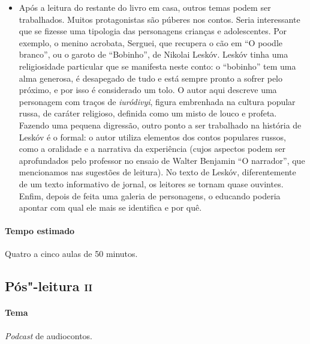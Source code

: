 \documentclass[11pt]{extarticle}
\begin{document}
\begin{itemize}
\item Após a leitura do restante do livro em casa, outros temas podem ser
trabalhados. Muitos protagonistas são púberes nos contos. Seria
interessante que se fizesse uma tipologia das personagens crianças e
adolescentes. Por exemplo, o menino acrobata, Serguei, que recupera o
cão em ``O poodle branco'', ou o garoto de ``Bobinho'', de Nikolai
Leskóv. Leskóv tinha uma religiosidade particular que se
manifesta neste conto: o ``bobinho'' tem uma alma generosa, é desapegado
de tudo e está sempre pronto a sofrer pelo próximo, e por isso é
considerado um tolo. O autor aqui descreve uma personagem com traços de
\emph{iuródivyi}, figura embrenhada na cultura popular russa, de caráter
religioso, definida como um misto de louco e profeta. Fazendo uma
pequena digressão, outro ponto a ser trabalhado na história de Leskóv é
o formal: o autor utiliza elementos dos contos populares russos, como a
oralidade e a narrativa da experiência (cujos aspectos podem ser
aprofundados pelo professor no ensaio de Walter Benjamin ``O
narrador'', que mencionamos nas sugestões de leitura). No texto de
Leskóv, diferentemente de um texto informativo de jornal, os leitores se
tornam quase ouvintes. Enfim, depois de feita uma galeria de
personagens, o educando poderia apontar com qual ele mais se identifica
e por quê.
\end{itemize}


\paragraph{Tempo estimado} Quatro a cinco aulas de 50 minutos.

\subsection{Pós"-leitura \textsc{ii}}

\paragraph{Tema} \emph{Podcast} de audiocontos.

\end{document}
